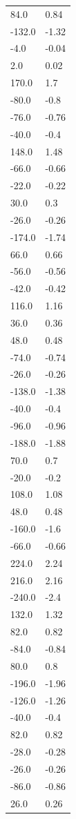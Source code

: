 \begin{longtable}{ll}
84.0 & 0.84 \\
-132.0 & -1.32 \\
-4.0 & -0.04 \\
2.0 & 0.02 \\
170.0 & 1.7 \\
-80.0 & -0.8 \\
-76.0 & -0.76 \\
-40.0 & -0.4 \\
148.0 & 1.48 \\
-66.0 & -0.66 \\
-22.0 & -0.22 \\
30.0 & 0.3 \\
-26.0 & -0.26 \\
-174.0 & -1.74 \\
66.0 & 0.66 \\
-56.0 & -0.56 \\
-42.0 & -0.42 \\
116.0 & 1.16 \\
36.0 & 0.36 \\
48.0 & 0.48 \\
-74.0 & -0.74 \\
-26.0 & -0.26 \\
-138.0 & -1.38 \\
-40.0 & -0.4 \\
-96.0 & -0.96 \\
-188.0 & -1.88 \\
70.0 & 0.7 \\
-20.0 & -0.2 \\
108.0 & 1.08 \\
48.0 & 0.48 \\
-160.0 & -1.6 \\
-66.0 & -0.66 \\
224.0 & 2.24 \\
216.0 & 2.16 \\
-240.0 & -2.4 \\
132.0 & 1.32 \\
82.0 & 0.82 \\
-84.0 & -0.84 \\
80.0 & 0.8 \\
-196.0 & -1.96 \\
-126.0 & -1.26 \\
-40.0 & -0.4 \\
82.0 & 0.82 \\
-28.0 & -0.28 \\
-26.0 & -0.26 \\
-86.0 & -0.86 \\
26.0 & 0.26 \\

\end{longtable}
